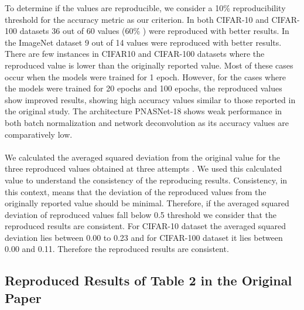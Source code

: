 To determine if the values are reproducible, we consider a 10\% reproducibility threshold for the accuracy metric as our criterion. In both CIFAR-10 and CIFAR-100 datasets 36 out of 60 values (60\% ) were reproduced with better results. In the ImageNet dataset 9 out of 14 values were reproduced with better results. There are few instances in CIFAR10 and CIFAR-100 datasets where the reproduced value is lower than the originally reported value. Most of these cases occur when the models were trained for 1 epoch. However, for the cases where the models were trained for 20 epochs and 100 epochs, the reproduced values show improved results, showing high accuracy values similar to those reported in the original study. The architecture PNASNet-18 shows weak performance in both batch normalization and network deconvolution as its accuracy values are comparatively low. \\\\
We calculated the averaged squared deviation from the original value for the three reproduced values obtained at three attempts . We used this calculated value to understand the consistency of the reproducing results. Consistency, in this context, means that the deviation of the reproduced values from the originally reported value should be minimal. Therefore, if the averaged squared deviation of reproduced values fall below 0.5 threshold we consider that the reproduced results are consistent. For CIFAR-10 dataset the averaged squared deviation lies between 0.00 to 0.23 and for CIFAR-100 dataset it lies between 0.00 and 0.11. Therefore the reproduced results are consistent.

\subsection{Reproduced Results of Table 2 in the Original Paper}


